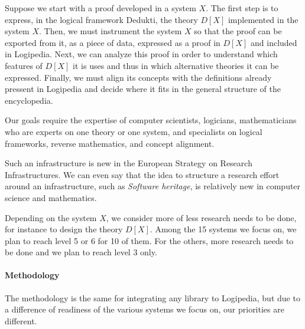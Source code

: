 Suppose we start with a proof developed in a system $X$. The first step
is to express, in the logical framework {\sc Dedukti}, the theory
$D[X]$ implemented in the system $X$. Then, we must instrument the
system $X$ so that the proof can be exported from it, as a piece of
data, expressed as a proof in $D[X]$ and included in {\sc
Logipedia}. Next, we can analyze this proof in order to understand
which features of $D[X]$ it is uses and thus in which alternative
theories it can be expressed.  Finally, we must align its concepts with
the definitions already pressent in {\sc Logipedia} and decide where
it fits in the general structure of the encyclopedia.

Our goals require the expertise of computer scientists,
logicians, mathematicians who are experts on one
theory or one system, and specialists on logical
frameworks, reverse mathematics, and concept alignment.

Such an infrastructure is new in the European Strategy on Research
Infrastructures. We can even say that the idea to structure a research
effort around an infrastructure, such as {\em Software heritage}, is
relatively new in computer science and mathematics.

Depending on the system $X$, we consider more of less research needs
to be done, for instance to design the theory $D[X]$. Among the 15
systems we focus on, we plan to reach level 5 or 6 for 10 of them.
For the others, more research needs to be done and we plan to reach
level 3 only.

\paragraph{Methodology}

The methodology is the same for integrating any library to {\sc Logipedia},
but due to a difference of readiness of the various systems we focus on,
our priorities are different.

